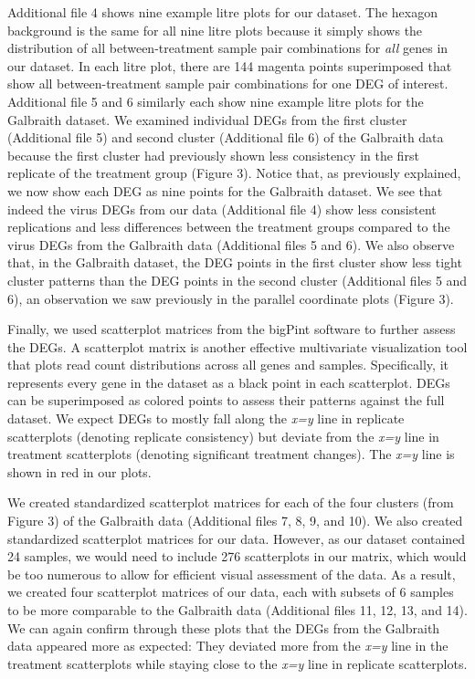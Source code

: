 \documentclass{bmcart}
\begin{document}
\begin{linenumbers}
\begin{doublespacing}
Additional file 4 shows nine example litre plots for our dataset. The hexagon background is the same for all nine litre plots because it simply shows the distribution of all between-treatment sample pair combinations for \textit{all} genes in our dataset. In each litre plot, there are 144 magenta points superimposed that show all between-treatment sample pair combinations for one DEG of interest. Additional file 5 and 6 similarly each show nine example litre plots for the Galbraith dataset. We examined individual DEGs from the first cluster (Additional file 5) and second cluster (Additional file 6) of the Galbraith data because the first cluster had previously shown less consistency in the first replicate of the treatment group (Figure 3). Notice that, as previously explained, we now show each DEG as nine points for the Galbraith dataset. We see that indeed the virus DEGs from our data (Additional file 4) show less consistent replications and less differences between the treatment groups compared to the virus DEGs from the Galbraith data (Additional files 5 and 6). We also observe that, in the Galbraith dataset, the DEG points in the first cluster show less tight cluster patterns than the DEG points in the second cluster (Additional files 5 and 6), an observation we saw previously in the parallel coordinate plots (Figure 3).

Finally, we used scatterplot matrices from the bigPint software to further assess the DEGs. A scatterplot matrix is another effective multivariate visualization tool that plots read count distributions across all genes and samples. Specifically, it represents every gene in the dataset as a black point in each scatterplot. DEGs can be superimposed as colored points to assess their patterns against the full dataset. We expect DEGs to mostly fall along the \textit{x=y} line in replicate scatterplots (denoting replicate consistency) but deviate from the \textit{x=y} line in treatment scatterplots (denoting significant treatment changes). The \textit{x=y} line is shown in red in our plots.

We created standardized scatterplot matrices for each of the four clusters (from Figure 3) of the Galbraith data (Additional files 7, 8, 9, and 10). We also created standardized scatterplot matrices for our data. However, as our dataset contained 24 samples, we would need to include 276 scatterplots in our matrix, which would be too numerous to allow for efficient visual assessment of the data. As a result, we created four scatterplot matrices of our data, each with subsets of 6 samples to be more comparable to the Galbraith data (Additional files 11, 12, 13, and 14). We can again confirm through these plots that the DEGs from the Galbraith data appeared more as expected: They deviated more from the \textit{x=y} line in the treatment scatterplots while staying close to the \textit{x=y} line in replicate scatterplots.


\end{doublespacing}
\end{linenumbers}
\end{document}
